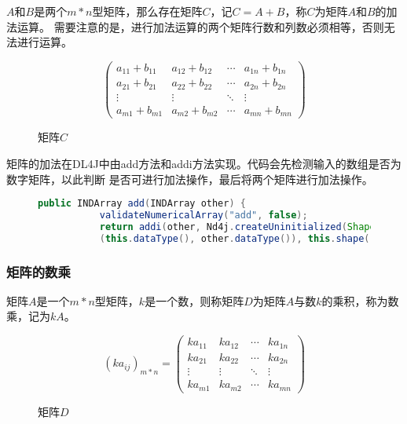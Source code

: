 $A$和$B$是两个$m*n$型矩阵，那么存在矩阵$C$，记$C=A+B$，称$C$为矩阵$A$和$B$的加法运算。
需要注意的是，进行加法运算的两个矩阵行数和列数必须相等，否则无法进行运算。

\begin{figure}[!hb]
			\begin{equation*}
				\left( \begin{matrix}
					a_{11}+b_{11} & a_{12}+b_{12} & \cdots & a_{1n}+b_{1n}\\
					a_{21}+b_{21} & a_{22}+b_{22} & \cdots & a_{2n}+b_{2n}\\
					\vdots & \vdots & \ddots & \vdots\\
					a_{m1}+b_{m1} & a_{m2}+b_{m2} & \cdots & a_{mn}+b_{mn}
					\end{matrix}
					\right )
					\end{equation*}
			\caption{矩阵$C$}
\end{figure}

矩阵的加法在DL4J中由add方法和addi方法实现。代码会先检测输入的数组是否为数字矩阵，以此判断
是否可进行加法操作，最后将两个矩阵进行加法操作。


\begin{figure}[!hb]
	\begin{lstlisting}[language=Java]
		public INDArray add(INDArray other) {
	       validateNumericalArray("add", false);
		   return addi(other, Nd4j.createUninitialized(Shape.pickPairwiseDataType
		   (this.dataType(), other.dataType()), this.shape(), this.ordering()));}
	\end{lstlisting}
\end{figure}

\subsubsection{矩阵的数乘}

矩阵$A$是一个$m*n$型矩阵，$k$是一个数，则称矩阵$D$为矩阵$A$与数$k$的乘积，称为数乘，记为$kA$。

\begin{figure}[!ht]
	\begin{equation}
		(ka_{ij})_{m*n}=
		\left( \begin{matrix}
			ka_{11} & ka_{12} & \cdots & ka_{1n}\\
			ka_{21} & ka_{22} & \cdots & ka_{2n}\\
			\vdots & \vdots & \ddots & \vdots\\
			ka_{m1} & ka_{m2} & \cdots & ka_{mn}
			\end{matrix}
			\right )
	\end{equation}
	\caption{矩阵$D$}
\end{figure}

